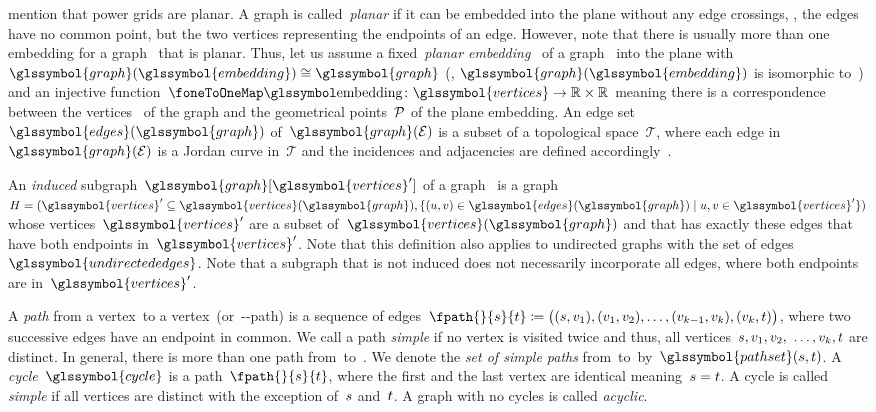 \textcite[p.13]{Cai12} mention that power grids are planar. A graph is
called~\emph{planar} if it can be embedded into the plane without any edge
crossings, \ie, the edges have no common point, but the two vertices
representing the endpoints of an edge. However, note that there is usually more
than one embedding for a graph~ that is planar. Thus, let us
assume a fixed~\emph{planar embedding}~ of a
graph~ into the plane
with~$\glssymbol{graph}(\glssymbol{embedding})\cong\glssymbol{graph}$ (\ie,
$\glssymbol{graph}(\glssymbol{embedding})$ is isomorphic to~)
and an injective
function~$\embeddingMap\colon\glssymbol{vertices}\to\reals\times\reals$ meaning
there is a correspondence between the vertices~ of the graph
and the geometrical points~$\mathcal{P}$ of the plane embedding. An edge
set~$\glssymbol{edges}(\glssymbol{graph})$ of~$\glssymbol{graph}(\embedding)$ is
a subset of a topological space~$\mathcal{T}$, where each edge
in~$\glssymbol{graph}(\embedding)$ is a Jordan curve in~$\mathcal{T}$ and the
incidences and adjacencies are defined accordingly~\parencite{Gro01}.
 
An \emph{induced} subgraph~$\glssymbol{graph} [ \glssymbol{vertices}' ]$ of a
graph~ is a graph~$
    \subgraph
    =
    (
        \glssymbol{vertices}'
        \subseteq
        \glssymbol{vertices}(\glssymbol{graph}), 
        \{
            (\vertexa,\vertexb)
            \in
            \glssymbol{edges}
            (\glssymbol{graph})
            \mid
            \vertexa,
            \vertexb
            \in
            \glssymbol{vertices}'
        \} 
    )
$ whose vertices~$\glssymbol{vertices}'$ are a subset of~$\glssymbol{vertices}
(\glssymbol{graph})$ and that has exactly these edges that have both endpoints
in~$\glssymbol{vertices}'$. Note that this definition also applies to undirected
graphs with the set of edges~$\glssymbol{undirectededges}$. Note that a subgraph
that is not induced does not necessarily incorporate all edges, where both
endpoints are in~$\glssymbol{vertices}'$.
 
A \emph{path} from a vertex~\source to a vertex~\sink (or~\source-\sink-path) is
a sequence of edges~$
    \fpath{}{\source}{\sink} 
    \coloneqq 
    \big( 
        (\source,\vertex_1), 
        (\vertex_1,\vertex_2), 
        \dots,
        (\vertex_{k-1}, \vertex_k), 
        (\vertex_k, \sink) 
    \big)
$, where two successive edges have an endpoint in common. We call a path
\emph{simple} if no vertex is visited twice and thus, all vertices~$s,
v_1, v_2,$ $\dots, v_k, t$ are distinct. In general, there
is more than one path from~\source to~\sink. We denote the \emph{set of simple
paths} from~\source to~\sink by~$\glssymbol{pathset}(\source,\sink)$. A
\emph{cycle}~$\glssymbol{cycle}$ is a
path~$
    \fpath{}{\source}{\sink}
$, where the first and the last vertex are identical meaning~$s = t$.
A cycle is called \emph{simple} if all vertices are distinct with the exception
of~$s$ and~$t$. A graph with no cycles is called \emph{acyclic}.

